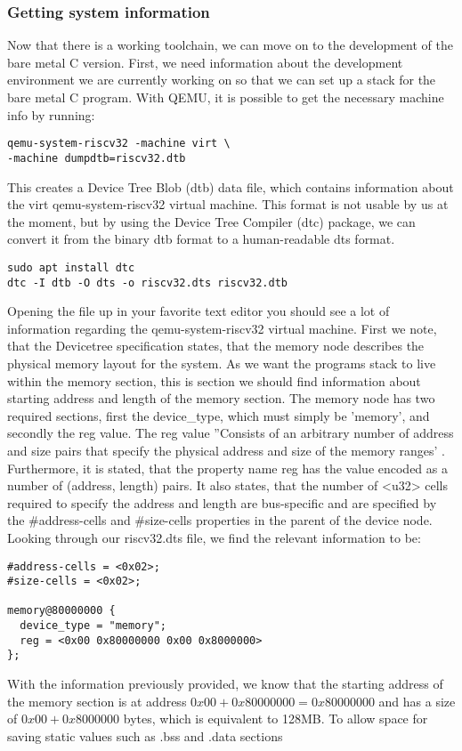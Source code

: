 \subsubsection{Getting system information}\label{sec:sys-info}
 Now that there is a working toolchain, we can move on to the development of the
 bare metal C version. First, we need information about the development
 environment we are currently working on so that we can set up a stack for the
 bare metal C program. With QEMU, it is possible to get the necessary machine
 info by running:
\begin{lstlisting}
qemu-system-riscv32 -machine virt \
-machine dumpdtb=riscv32.dtb
\end{lstlisting}
 This creates a Device Tree Blob (dtb) data file, which contains information
 about the virt qemu-system-riscv32 virtual machine. This format is not usable
 by us at the moment, but by using the Device Tree Compiler (dtc) package, we
 can convert it from the binary dtb format to a human-readable dts format.
\begin{lstlisting}
sudo apt install dtc
dtc -I dtb -O dts -o riscv32.dts riscv32.dtb
\end{lstlisting}
Opening the file up in your favorite text editor you should see a lot of
information regarding the qemu-system-riscv32 virtual machine. First we note,
that the Devicetree specification states, that the memory node describes the
physical memory layout for the system. As we want the programs stack to live
within the memory section, this is section we should find information about
starting address and length of the memory section. The memory node has two
required sections, first the device\_type, which must simply be 'memory', and
secondly the reg value. The reg value ''Consists of an arbitrary number of
address and size pairs that specify the physical address and size of the memory
ranges' \cite{DTS}. Furthermore, it is stated, that the property name reg has
the value encoded as a number of (address, length) pairs. It also states, that
the number of <u32> cells required to specify the address and length are
bus-specific and are specified by the \#address-cells and \#size-cells
properties in the parent of the device node. Looking through our riscv32.dts
file, we find the relevant information to be:
\begin{lstlisting}
#address-cells = <0x02>;
#size-cells = <0x02>;

memory@80000000 {
  device_type = "memory";
  reg = <0x00 0x80000000 0x00 0x8000000>
};
\end{lstlisting}
With the information previously provided, we know that the starting address of
the memory section is at address $0x00 + 0x80000000 = 0x80000000$ and has a size
of $0x00 + 0x8000000$ bytes, which is equivalent to 128MB. To allow space for
saving static values such as .bss and .data sections

